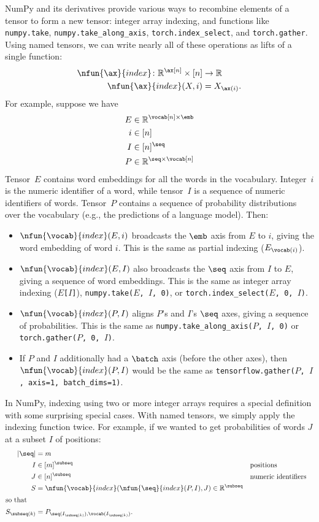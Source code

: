 NumPy and its derivatives provide various ways to recombine elements of a tensor to form a new tensor: integer array indexing, and functions like \verb|numpy.take|, \verb|numpy.take_along_axis|, \verb|torch.index_select|, and \verb|torch.gather|. Using named tensors, we can write nearly all of these operations as lifts of a single function:
\begin{align*}
  \nfun{\ax}{index} \colon \reals^{\ax[n]} \times [n] &\rightarrow \reals \\
  \nfun{\ax}{index}(X, i) &= X_{\ax(i)}.
\end{align*}
For example, suppose we have
\begin{align*}
  E &\in \reals^{\vocab[n] \times \emb} \\
  i &\in [n] \\
  I &\in [n]^{\seq} \\
  P &\in \reals^{\seq \times \vocab[n]}
\end{align*}
Tensor~$E$ contains word embeddings for all the words in the vocabulary. Integer~$i$ is the numeric identifier of a word, while tensor~$I$ is a sequence of numeric identifiers of words. Tensor~$P$ contains a sequence of probability distributions over the vocabulary (e.g., the predictions of a language model). Then:
\begin{itemize}
\item $\nfun{\vocab}{index}(E,i)$ broadcasts the $\emb$ axis from $E$ to $i$, giving the word embedding of word $i$. This is the same as partial indexing ($E_{\vocab(i)}$).
\item $\nfun{\vocab}{index}(E,I)$ also broadcasts the $\seq$ axis from $I$ to $E$, giving a sequence of word embeddings. This is the same as integer array indexing (\texttt{$E$[$I$]}), \texttt{numpy.take($E$, $I$, 0)}, or \texttt{torch.index\_select($E$, 0, $I$)}.
\item $\nfun{\vocab}{index}(P,I)$ aligns $P$'s and $I$'s $\seq$ axes, giving a sequence of probabilities. This is the same as \texttt{numpy.take\_along\_axis($P$, $I$, 0)} or \texttt{torch.gather($P$, 0, $I$)}.
\item If $P$ and $I$ additionally had a $\batch$ axis (before the other axes), then $\nfun{\vocab}{index}(P,I)$ would be the same as \texttt{tensorflow.gather($P$, $I$, axis=1, batch\_dims=1)}.
\end{itemize}

In NumPy, indexing using two or more integer arrays requires a special definition with some surprising special cases. With named tensors, we simply apply the indexing function twice. For example, if we wanted to get probabilities of words $J$ at a subset $I$ of positions:
\begin{align*}
  |\seq| &= m \\
  I &\in [m]^\subseq && \text{positions} \\
  J &\in [n]^\subseq && \text{numeric identifiers} \\
  S &= \nfun{\vocab}{index}(\nfun{\seq}{index}(P, I), J) \in \reals^{\subseq} \\
\intertext{so that}  
  S_{\subseq(k)} &= P_{\seq(I_{\subseq(k)}), \vocab(I_{\subseq(k)})}.
\end{align*}


